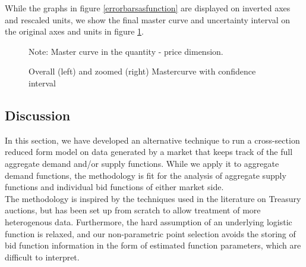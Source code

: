 While the graphs in figure \ref{errorbarsasfunction} are displayed on inverted axes and rescaled units, we show the final master curve and uncertainty interval on the original axes and units in figure \ref{notrescaledmastercurves}. 

\begin{figure}[!ht]
\begin{center}
\caption{Overall (left) and zoomed (right) Mastercurve with confidence interval}
\label{notrescaledmastercurves}
\end{center}
{ \small Note: Master curve in the quantity - price dimension.  } 
\end{figure}


\subsection{Discussion}
\label{pointccl}
In this section, we have developed an alternative technique to run a cross-section reduced form model on data generated by a market that keeps track of the full aggregate demand and/or supply functions. While we apply it to aggregate demand functions, the methodology is fit for the analysis of aggregate supply functions and individual bid functions of either market side.  \\

The methodology is inspired by the techniques used in the literature on Treasury auctions, but has been set up from scratch to allow treatment of more heterogenous data. Furthermore, the hard assumption of an underlying logistic function is relaxed, and our non-parametric point selection avoids the storing of bid function information in the form of estimated function parameters, which are difficult to interpret. \\

